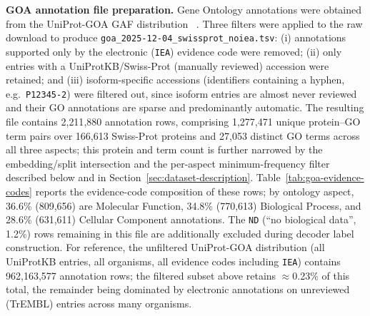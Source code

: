 \documentclass[11pt,a4paper]{article}
\begin{document}
\textbf{GOA annotation file preparation.} Gene Ontology annotations were obtained from the UniProt-GOA GAF distribution ~\cite{uniprot2023,geneontology2021}. Three filters were applied to the raw download to produce \texttt{goa\_2025-12-04\_swissprot\_noiea.tsv}: (i) annotations supported only by the electronic (\texttt{IEA}) evidence code were removed; (ii) only entries with a UniProtKB/Swiss-Prot (manually reviewed) accession were retained; and (iii) isoform-specific accessions (identifiers containing a hyphen, e.g.\ \texttt{P12345-2}) were filtered out, since isoform entries are almost never reviewed and their GO annotations are sparse and predominantly automatic. The resulting file contains 2{,}211{,}880 annotation rows, comprising 1{,}277{,}471 unique protein--GO term pairs over 166{,}613 Swiss-Prot proteins and 27{,}053 distinct GO terms across all three aspects; this protein and term count is further narrowed by the embedding/split intersection and the per-aspect minimum-frequency filter described below and in Section~\ref{sec:dataset-description}. Table~\ref{tab:goa-evidence-codes} reports the evidence-code composition of these rows; by ontology aspect, 36.6\% (809{,}656) are Molecular Function, 34.8\% (770{,}613) Biological Process, and 28.6\% (631{,}611) Cellular Component annotations. The \texttt{ND} (``no biological data'', 1.2\%) rows remaining in this file are additionally excluded during decoder label construction. For reference, the unfiltered UniProt-GOA distribution (all UniProtKB entries, all organisms, all evidence codes including \texttt{IEA}) contains 962{,}163{,}577 annotation rows; the filtered subset above retains $\approx$0.23\% of this total, the remainder being dominated by electronic annotations on unreviewed (TrEMBL) entries across many organisms.
\end{document}
